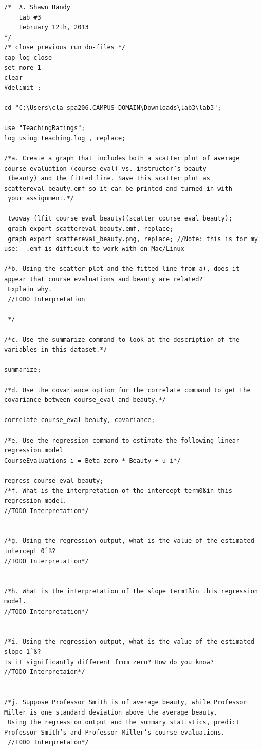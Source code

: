 \documentclass{article}
\begin{document}
\begin{enumerate}
{\begin{verbatim}
/* 	A. Shawn Bandy
	Lab #3 
	February 12th, 2013
*/
/* close previous run do-files */
cap log close
set more 1
clear
#delimit ;

cd "C:\Users\cla-spa206.CAMPUS-DOMAIN\Downloads\lab3\lab3";

use "TeachingRatings";
log using teaching.log , replace;

/*a. Create a graph that includes both a scatter plot of average course evaluation (course_eval) vs. instructor’s beauty
 (beauty) and the fitted line. Save this scatter plot as scattereval_beauty.emf so it can be printed and turned in with
 your assignment.*/

 twoway (lfit course_eval beauty)(scatter course_eval beauty);
 graph export scattereval_beauty.emf, replace;
 graph export scattereval_beauty.png, replace; //Note: this is for my use:  .emf is difficult to work with on Mac/Linux
 
/*b. Using the scatter plot and the fitted line from a), does it appear that course evaluations and beauty are related?
 Explain why.
 //TODO Interpretation
 
 */
 
/*c. Use the summarize command to look at the description of the variables in this dataset.*/

summarize;

/*d. Use the covariance option for the correlate command to get the covariance between course_eval and beauty.*/

correlate course_eval beauty, covariance;

/*e. Use the regression command to estimate the following linear regression model
CourseEvaluations_i = Beta_zero * Beauty + u_i*/

regress course_eval beauty;
/*f. What is the interpretation of the intercept term0ßin this regression model.
//TODO Interpretation*/


/*g. Using the regression output, what is the value of the estimated intercept 0ˆß?
//TODO Interpretation*/


/*h. What is the interpretation of the slope term1ßin this regression model. 
//TODO Interpretation*/


/*i. Using the regression output, what is the value of the estimated slope 1ˆß?
Is it significantly different from zero? How do you know?
//TODO Interpretaion*/


/*j. Suppose Professor Smith is of average beauty, while Professor Miller is one standard deviation above the average beauty.
 Using the regression output and the summary statistics, predict Professor Smith’s and Professor Miller’s course evaluations.
 //TODO Interpretaion*/


\end{verbatim}}
\end{enumerate}
\end{document}
